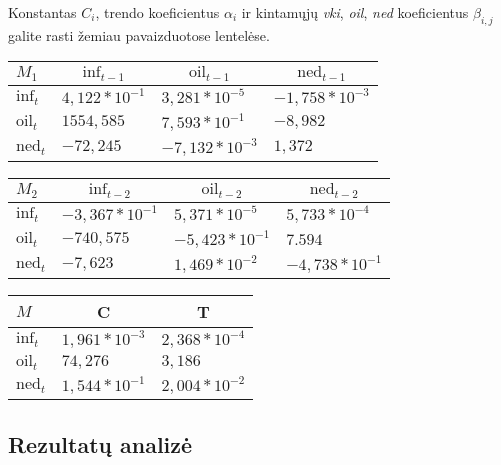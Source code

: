 \documentclass[a4paper]{article}
\begin{document}
Konstantas $C_i$, trendo koeficientus $\alpha_i$ ir kintamųjų \textit{vki}, \textit{oil},  \textit{ned} koeficientus $\beta_{i,j}$ galite rasti žemiau pavaizduotose lentelėse.

\begin{table}[ht]
 \begin{center}
 \begin{tabular}{llll}\hline\hline
\multicolumn{1}{l}{$M_1$}&\multicolumn{1}{c}{$\text{inf}_{t-1}$}&\multicolumn{1}{c}{$\text{oil}_{t-1}$}&\multicolumn{1}{c}{$\text{ned}_{t-1}$}\tabularnewline
\hline
$\text{inf}_{t}$&$ 4,122 * 10^{-1}$&$ 3,281 * 10^{-5}$&$-1,758 * 10^{-3}$\tabularnewline
$\text{oil}_{t}$&$        1554,585$&$ 7,593 * 10^{-1}$&$-8,982$\tabularnewline
$\text{ned}_{t}$&$        -72,245$&$-7,132 * 10^{-3}$&$ 1,372$\tabularnewline
\hline
 \end{tabular}
 \end{center}
\end{table}

\begin{table}[ht]
 \begin{center}
 \begin{tabular}{llll}\hline\hline
\multicolumn{1}{l}{$M_2$}&\multicolumn{1}{c}{$\text{inf}_{t-2}$}&\multicolumn{1}{c}{$\text{oil}_{t-2}$}&\multicolumn{1}{c}{$\text{ned}_{t-2}$}\tabularnewline
\hline
$\text{inf}_{t}$&$-3,367 * 10^{-1}$&$ 5,371 * 10^{-5}$&$ 5,733 * 10^{-4}$\tabularnewline
$\text{oil}_{t}$&$        -740,575$&$-5,423 * 10^{-1}$&$ 7.594$\tabularnewline
$\text{ned}_{t}$&$          -7,623$&$ 1,469 * 10^{-2}$&$-4,738 * 10^{-1}$\tabularnewline
\hline
 \end{tabular}
 \end{center}
\end{table}

\begin{table}[ht]
 \begin{center}
 \begin{tabular}{lll}\hline\hline
\multicolumn{1}{l}{$M$}&\multicolumn{1}{c}{C}&\multicolumn{1}{c}{T}\tabularnewline
\hline
$\text{inf}_{t}$&$ 1,961 * 10^{-3}$&$2,368 * 10^{-4}$\tabularnewline
$\text{oil}_{t}$&$74,276$&$3,186$\tabularnewline
$\text{ned}_{t}$&$ 1,544 * 10^{-1}$&$2,004 * 10^{-2}$\tabularnewline
\hline
 \end{tabular}
 \end{center}
\end{table}

\subsection{Rezultatų analizė}
\end{document}
